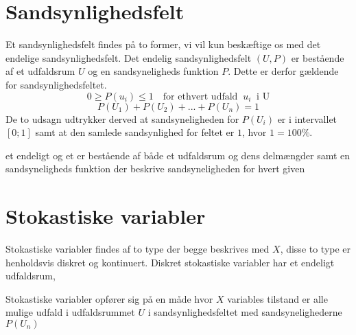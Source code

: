\documentclass[../../SRP.tex]{subfiles}
\begin{document}
\section{Sandsynlighedsfelt}

Et sandsynlighedsfelt findes på to former, vi vil kun beskæftige os med det endelige sandsynlighedsfelt. Det endelig sandsynlighedsfelt $(U, P)$ er bestående af et udfaldsrum $U$ og en sandsyneligheds funktion $P$. Dette er derfor gældende for sandsynlighedsfeltet.
\begin{equation}
  0 \geq P(u_i) \leq 1 \quad \textrm{for ethvert udfald $\ u_i\ $ i U}
\end{equation}
\begin{equation}
  P(U_1) + P(U_2) + ... + P(U_n) = 1
\end{equation}
De to udsagn udtrykker derved at sandsyneligheden for $P(U_i)$ er i intervallet $[0;1]$ samt at den samlede sandsynlighed for feltet er $1$, hvor $1 = 100\%$. 

 et endeligt og et  er bestående af både et udfaldsrum og dens delmængder samt en sandsyneligheds funktion der beskrive sandsyneligheden for hvert given  \cite{SC}

\section{Stokastiske variabler}

Stokastiske variabler findes af to type der begge beskrives med $X$, disse to type er henholdsvis diskret og kontinuert. Diskret stokastiske variabler har et endeligt udfaldsrum,

Stokastiske variabler opfører sig på en måde hvor $X$ variables tilstand er alle mulige udfald i udfaldsrummet $U$ i sandsynlighedsfeltet med sandsynelighederne $P(U_n)$
\end{document}
